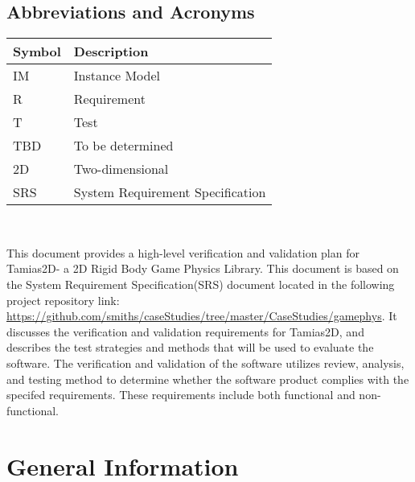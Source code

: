 \documentclass[12pt, titlepage]{article}
\newcommand{\progname}{Tamias2D}
\begin{document}
\subsection{Abbreviations and Acronyms}
\begin{tabular}{l l} 
	\toprule		
	\textbf{Symbol} & \textbf{Description}\\
	\midrule 
	IM & Instance Model\\
	R & Requirement\\
	T & Test\\
	TBD & To be determined\\
	2D & Two-dimensional\\
	SRS & System Requirement Specification\\
	\bottomrule
\end{tabular}\\


\newpage

\tableofcontents

\listoftables

\listoffigures

\newpage


This document provides a high-level verification and validation plan for \progname - a 2D Rigid Body Game Physics Library. This document is based on the System Requirement Specification(SRS) document located in the following project repository link: \url{https://github.com/smiths/caseStudies/tree/master/CaseStudies/gamephys}. It discusses the verification and validation requirements for \progname, and describes the test strategies and methods that will be used to evaluate the software. The verification and validation of the software utilizes review, analysis, and testing method to determine whether the software product complies with the specifed requirements. These requirements include both functional and non-functional.


\section{General Information}
\end{document}
